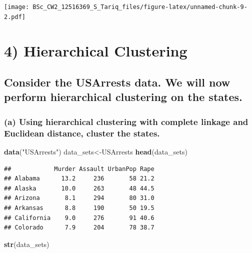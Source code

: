 \documentclass[]{article}
\newenvironment{Shaded}{\begin{snugshade}}{\end{snugshade}}
\newcommand{\KeywordTok}[1]{\textcolor[rgb]{0.13,0.29,0.53}{\textbf{#1}}}
\newcommand{\NormalTok}[1]{#1}
\newcommand{\StringTok}[1]{\textcolor[rgb]{0.31,0.60,0.02}{#1}}
\begin{document}
\texttt{[image: BSc\_CW2\_12516369\_S\_Tariq\_files/figure-latex/unnamed-chunk-9-2.pdf]}

\hypertarget{hierarchical-clustering}{%
\section{4) Hierarchical Clustering}\label{hierarchical-clustering}}

\hypertarget{consider-the-usarrests-data.-we-will-now-perform-hierarchical-clustering-on-the-states.}{%
\subsection{Consider the USArrests data. We will now perform
hierarchical clustering on the
states.}\label{consider-the-usarrests-data.-we-will-now-perform-hierarchical-clustering-on-the-states.}}

\hypertarget{a-using-hierarchical-clustering-with-complete-linkage-and-euclidean-distance-cluster-the-states.}{%
\subsubsection{(a) Using hierarchical clustering with complete linkage
and Euclidean distance, cluster the
states.}\label{a-using-hierarchical-clustering-with-complete-linkage-and-euclidean-distance-cluster-the-states.}}

\begin{Shaded}
\begin{Highlighting}[]
\KeywordTok{data}\NormalTok{(}\StringTok{"USArrests"}\NormalTok{)}
\NormalTok{data_sets<-USArrests }
\KeywordTok{head}\NormalTok{(data_sets)}
\end{Highlighting}
\end{Shaded}

\begin{verbatim}
##            Murder Assault UrbanPop Rape
## Alabama      13.2     236       58 21.2
## Alaska       10.0     263       48 44.5
## Arizona       8.1     294       80 31.0
## Arkansas      8.8     190       50 19.5
## California    9.0     276       91 40.6
## Colorado      7.9     204       78 38.7
\end{verbatim}

\begin{Shaded}
\begin{Highlighting}[]
\KeywordTok{str}\NormalTok{(data_sets)}
\end{Highlighting}
\end{Shaded}
\end{document}
